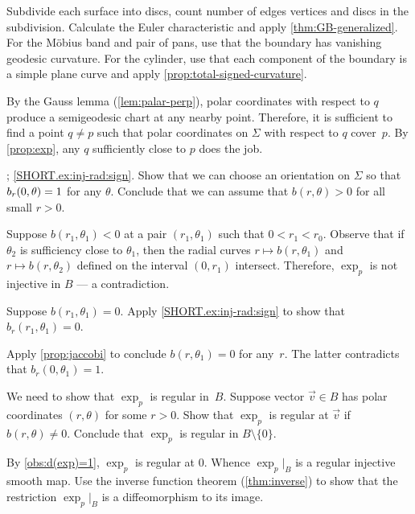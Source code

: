 \begin{multicols}{2}
Subdivide each surface into discs,
count number of edges vertices and discs in the subdivision.
Calculate the Euler characteristic and apply \ref{thm:GB-generalized}.
For the Möbius band and pair of pans, use that the boundary has vanishing geodesic curvature.
For the cylinder, use that each component of the boundary is a simple plane curve and apply \ref{prop:total-signed-curvature}. 


\setcounter{eqtn}{0}

By the Gauss lemma (\ref{lem:palar-perp}), polar coordinates with respect to $q$ produce a semigeodesic chart at any nearby point.
Therefore, it is sufficient to find a point $q\ne p$ such that polar coordinates on $\Sigma$ with respect to $q$ cover~$p$.
By \ref{prop:exp}, any $q$ sufficiently close to $p$ does the job.

\parbf{\ref{ex:inj-rad}}; \ref{SHORT.ex:inj-rad:sign}.
Show that we can choose an orientation on $\Sigma$ so that $b_r(0,\theta)\z=1$ for any $\theta$.
Conclude that we can assume that $b(r,\theta)>0$ for all small $r>0$.

Suppose $b(r_1,\theta_1)<0$ at a pair $(r_1,\theta_1)$ such that $0<r_1<r_0$.
Observe that if $\theta_2$ is sufficiency close to $\theta_1$, then the radial curves $r\mapsto b(r,\theta_1)$ and $r\mapsto b(r,\theta_2)$ defined on the interval $(0,r_1)$ intersect.
Therefore, $\exp_p$ is not injective in $B$ --- a contradiction.

Suppose $b(r_1,\theta_1)=0$.
Apply \ref{SHORT.ex:inj-rad:sign} to show that $b_r(r_1,\theta_1)=0$.

Apply \ref{prop:jaccobi} to conclude $b(r,\theta_1)=0$ for any~$r$.
The latter contradicts that $b_r(0,\theta_1)=1$.

We need to show that $\exp_p$ is regular in~$B$.
Suppose vector $\vec v\in B$ has polar coordinates $(r,\theta)$ for some $r>0$.
Show that $\exp_p$ is regular at $\vec v$ if $b(r,\theta)\ne 0$.
Conclude that $\exp_p$ is regular in $B\setminus \{0\}$.

By \ref{obs:d(exp)=1}, $\exp_p$ is regular at $0$.
Whence $\exp_p|_B$ is a regular injective smooth map.
Use the inverse function theorem (\ref{thm:inverse}) to show that the restriction $\exp_p|_B$ is a diffeomorphism to its image. 
 




\end{multicols}
